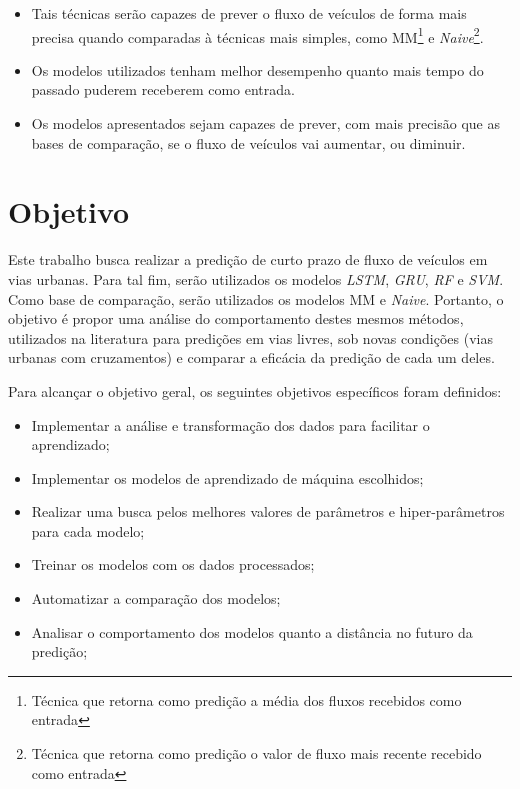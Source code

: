 \begin{itemize}
    \item Tais técnicas serão capazes de prever o fluxo de veículos de forma mais precisa quando comparadas à técnicas mais simples, como \acrfull{MM}\footnote{Técnica que retorna como predição a média dos fluxos recebidos como entrada} e \textit{Naive}\footnote{Técnica que retorna como predição o valor de fluxo mais recente recebido como entrada}.
    \item Os modelos utilizados tenham melhor desempenho quanto mais tempo do passado puderem receberem como entrada.
    \item Os modelos apresentados sejam capazes de prever, com mais precisão que as bases de comparação, se o fluxo de veículos vai aumentar, ou diminuir.
\end{itemize}


\section{Objetivo}
\label{section:objectives}
Este trabalho busca realizar a predição de curto prazo de fluxo de veículos em vias urbanas. Para tal fim, serão utilizados os modelos \textit{\acrfull{LSTM}}, \textit{\acrfull{GRU}}, \textit{\acrfull{RF}} e \textit{\acrfull{SVM}}. Como base de comparação, serão utilizados os modelos \acrshort{MM} e \textit{Naive}. Portanto, o objetivo é propor uma análise do comportamento destes mesmos métodos, utilizados na literatura para predições em vias livres, sob novas condições (vias urbanas com cruzamentos) e comparar a eficácia da predição de cada um deles.

Para alcançar o objetivo geral, os seguintes objetivos específicos foram definidos:

\begin{itemize}
    \item Implementar a análise e transformação dos dados para facilitar o aprendizado;
    \item Implementar os modelos de aprendizado de máquina escolhidos; 
    \item Realizar uma busca pelos melhores valores de parâmetros e hiper-parâmetros para cada modelo;
    \item Treinar os modelos com os dados processados;
    \item Automatizar a comparação dos modelos;
    \item Analisar o comportamento dos modelos quanto a distância no futuro da predição;
\end{itemize}

